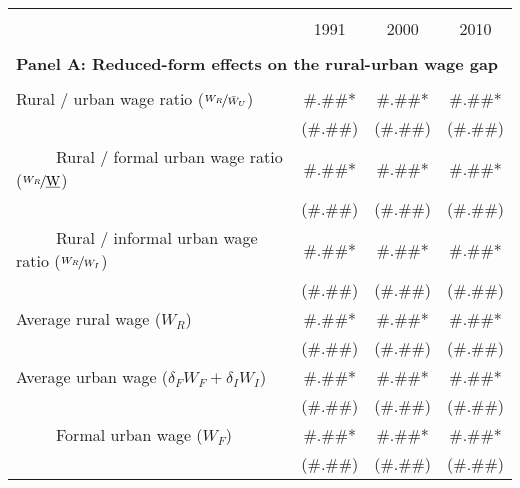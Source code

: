 \begin{tabular}{lrrr}
\toprule &       &       &  \\
      & \multicolumn{1}{c}{1991} & \multicolumn{1}{c}{2000} & \multicolumn{1}{c}{2010} \bigstrut[b]\\
\cline{2-4}      &       &       &  \bigstrut[t]\\
\multicolumn{4}{l}{\textbf{Panel A: Reduced-form effects on the rural-urban wage gap}} \\
      &       &       &  \\
Rural / urban wage ratio ($\nicefrac{W_{R}}{\bar{W}_{U}}$) & \multicolumn{1}{c}{\#.\#\#*} & \multicolumn{1}{c}{\#.\#\#*} & \multicolumn{1}{c}{\#.\#\#*} \\
      & \multicolumn{1}{c}{(\#.\#\#)} & \multicolumn{1}{c}{(\#.\#\#)} & \multicolumn{1}{c}{(\#.\#\#)} \\
~~~~~Rural / formal urban wage ratio ($\nicefrac{W_{R}}{\underbar{W}}$) & \multicolumn{1}{c}{\#.\#\#*} & \multicolumn{1}{c}{\#.\#\#*} & \multicolumn{1}{c}{\#.\#\#*} \\
      & \multicolumn{1}{c}{(\#.\#\#)} & \multicolumn{1}{c}{(\#.\#\#)} & \multicolumn{1}{c}{(\#.\#\#)} \\
~~~~~Rural / informal urban wage ratio ($\nicefrac{W_{R}}{W_{I}}$) & \multicolumn{1}{c}{\#.\#\#*} & \multicolumn{1}{c}{\#.\#\#*} & \multicolumn{1}{c}{\#.\#\#*} \\
      & \multicolumn{1}{c}{(\#.\#\#)} & \multicolumn{1}{c}{(\#.\#\#)} & \multicolumn{1}{c}{(\#.\#\#)} \\
Average rural wage ($W_{R}$) & \multicolumn{1}{c}{\#.\#\#*} & \multicolumn{1}{c}{\#.\#\#*} & \multicolumn{1}{c}{\#.\#\#*} \\
      & \multicolumn{1}{c}{(\#.\#\#)} & \multicolumn{1}{c}{(\#.\#\#)} & \multicolumn{1}{c}{(\#.\#\#)} \\
Average urban wage ($\delta_{F} W_{F}+\delta_{I} W_{I}$) & \multicolumn{1}{c}{\#.\#\#*} & \multicolumn{1}{c}{\#.\#\#*} & \multicolumn{1}{c}{\#.\#\#*} \\
      & \multicolumn{1}{c}{(\#.\#\#)} & \multicolumn{1}{c}{(\#.\#\#)} & \multicolumn{1}{c}{(\#.\#\#)} \\
~~~~~Formal urban wage ($W_{F}$) & \multicolumn{1}{c}{\#.\#\#*} & \multicolumn{1}{c}{\#.\#\#*} & \multicolumn{1}{c}{\#.\#\#*} \\
      & \multicolumn{1}{c}{(\#.\#\#)} & \multicolumn{1}{c}{(\#.\#\#)} & \multicolumn{1}{c}{(\#.\#\#)} \\

\end{tabular}
